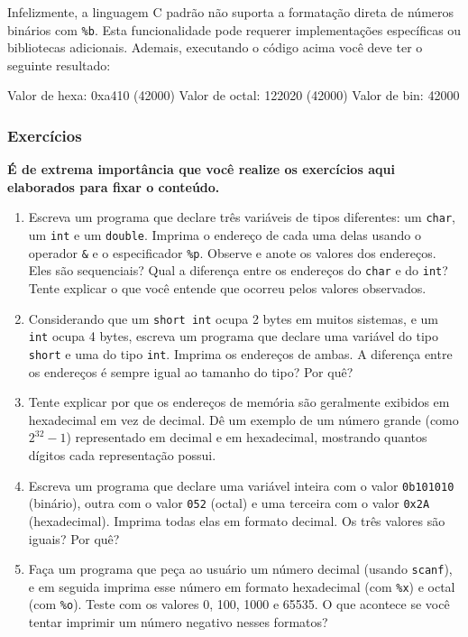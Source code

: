 Infelizmente, a linguagem C padrão não suporta a formatação direta de números 
binários com \texttt{\%b}. Esta funcionalidade pode requerer implementações 
específicas ou bibliotecas adicionais. Ademais, executando o código acima você 
deve ter o seguinte resultado:

\begin{textbox}
    Valor de hexa: 0xa410 (42000)
    Valor de octal: 122020 (42000)
    Valor de bin: 42000
\end{textbox}

\subsubsection{Exercícios}

\textbf{É de extrema importância que você realize os exercícios aqui elaborados para fixar o conteúdo.}

\begin{enumerate}
    \item {Escreva um programa que declare três variáveis de tipos diferentes: 
        um \texttt{char}, um \texttt{int} e um \texttt{double}. Imprima o 
        endereço de cada uma delas usando o operador \texttt{\&} e o 
        especificador \texttt{\%p}. Observe e anote os valores dos endereços. 
        Eles são sequenciais? Qual a diferença entre os endereços do 
        \texttt{char} e do \texttt{int}? Tente explicar o que você entende que 
        ocorreu pelos valores observados.}
    \item {Considerando que um \texttt{short int} ocupa 2 bytes em muitos 
        sistemas, e um \texttt{int} ocupa 4 bytes, escreva um programa que 
        declare uma variável do tipo \texttt{short} e uma do tipo \texttt{int}. 
        Imprima os endereços de ambas. A diferença entre os endereços é sempre 
        igual ao tamanho do tipo? Por quê?}
    \item {Tente explicar por que os endereços de memória são geralmente exibidos 
        em hexadecimal em vez de decimal. Dê um exemplo de um número grande 
        (como \(2^{32}-1\)) representado em decimal e em hexadecimal, mostrando 
        quantos dígitos cada representação possui.}
    \item {Escreva um programa que declare uma variável inteira com o valor 
        \texttt{0b101010} (binário), outra com o valor \texttt{052} (octal) e 
        uma terceira com o valor \texttt{0x2A} (hexadecimal). Imprima todas elas 
        em formato decimal. Os três valores são iguais? Por quê?}
    \item {Faça um programa que peça ao usuário um número decimal (usando 
        \texttt{scanf}), e em seguida imprima esse número em formato hexadecimal 
        (com \texttt{\%x}) e octal (com \texttt{\%o}). Teste com os valores 0, 
        100, 1000 e 65535. O que acontece se você tentar imprimir um número 
        negativo nesses formatos?}
\end{enumerate}
